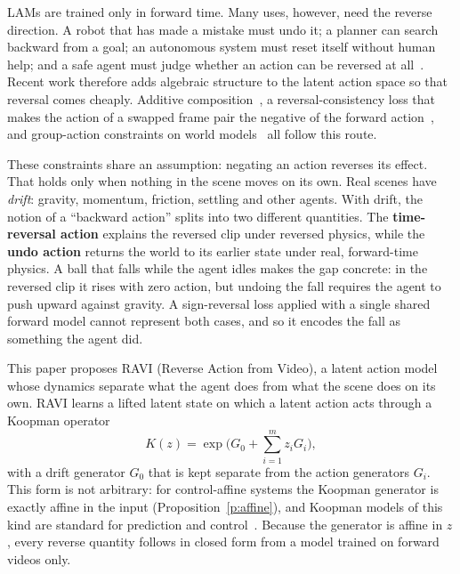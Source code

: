 \documentclass{jcse}
\newcommand{\method}{RAVI}
\begin{document}
LAMs are trained only in forward time.
Many uses, however, need the reverse direction.
A robot that has made a mistake must undo it; a planner can search backward from a goal; an autonomous system must reset itself without human help; and a safe agent must judge whether an action can be reversed at all~\cite{grinsztajn2021reversibility,lai2020bmpo,goyal2019recall,eysenbach2018leave}.
Recent work therefore adds algebraic structure to the latent action space so that reversal comes cheaply.
Additive composition~\cite{wei2026aclam}, a reversal-consistency loss that makes the action of a swapped frame pair the negative of the forward action~\cite{tang2026alam}, and group-action constraints on world models~\cite{wang2026groupactions,keurti2023hae} all follow this route.

These constraints share an assumption: negating an action reverses its effect.
That holds only when nothing in the scene moves on its own.
Real scenes have \emph{drift}: gravity, momentum, friction, settling and other agents.
With drift, the notion of a ``backward action'' splits into two different quantities.
The \textbf{time-reversal action} explains the reversed clip under reversed physics, while the \textbf{undo action} returns the world to its earlier state under real, forward-time physics.
A ball that falls while the agent idles makes the gap concrete: in the reversed clip it rises with zero action, but undoing the fall requires the agent to push upward against gravity.
A sign-reversal loss applied with a single shared forward model cannot represent both cases, and so it encodes the fall as something the agent did.

This paper proposes {\method} (Reverse Action from Video), a latent action model whose dynamics separate what the agent does from what the scene does on its own.
{\method} learns a lifted latent state on which a latent action acts through a Koopman operator~\cite{koopman1931,mezic2005spectral,brunton2022modern}
\begin{equation}
K(z)=\exp\Big(G_0+\sum_{i=1}^m z_iG_i\Big),
\label{e:koopman}
\end{equation}
with a drift generator $G_0$ that is kept separate from the action generators $G_i$.
This form is not arbitrary: for control-affine systems the Koopman generator is exactly affine in the input (Proposition~\ref{p:affine}), and Koopman models of this kind are standard for prediction and control~\cite{korda2018koopman,bruder2021bilinear}.
Because the generator is affine in $z$, every reverse quantity follows in closed form from a model trained on forward videos only.
\end{document}

